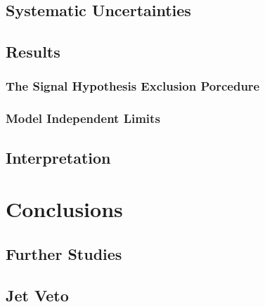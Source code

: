 \documentclass[10pt,twoside,cucitura,classica,english,openany]{toptesi}
\begin{document}


\section{Systematic Uncertainties}
\label{sec:syst-uncert}



\section{Results}
\label{sec:results}



\subsection{The Signal Hypothesis Exclusion Porcedure}
\label{sec:sign-hypoth-excl}



\subsection{Model Independent Limits}
\label{sec:model-indep-limits}



\section{Interpretation}
\label{sec:interpretation}



\chapter{Conclusions}
\label{cha:conclusions}



\begin{appendices}
  \chapter{Further Studies}

  \section{Jet Veto }
  \label{sec:jet-veto}

  
\end{appendices}

\printglossaries

 \printbibliography
\end{document}
